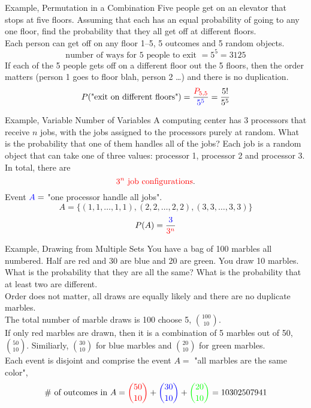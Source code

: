 \documentclass[]{beamer}
\newcommand{\blue}[1]{{\color{blue} #1}}
\newcommand{\red}[1]{{\color{red} #1}}
\newcommand{\grn}[1]{{\color{green} #1}}
\newcommand{\nl}[1]{\vspace{#1 em}}
\begin{document}
\begin{frame}{Example, Permutation in a Combination}
    Five people get on an elevator that stops at five floors. Assuming that each has an equal probability of going to any one floor, find the probability that they all get off at different floors.\\
    \nl{0.5}
    \pause Each person can get off on any floor 1--5, \blue{5 outcomes and 5 random objects}.
    \[\text{number of ways for 5 people to exit } = 5^5 = 3125\]
    \pause If each of the \red{5 people} gets off on a different floor out the \red{5 floors}, then the order matters (person 1 goes to floor blah, person 2 \ldots) and there is no duplication.
    \pause \[P(\text{"exit on different floors"}) = \frac{\red{P_{5,5}}}{\blue{5^5}} = \frac{5!}{5^5}\]
\end{frame}

\begin{frame}{Example, Variable Number of Variables}
    A computing center has 3 processors that receive $n$ jobs, with the jobs assigned to the processors purely at random. What is the probability that one of them handles all of the jobs?
    \pause
    Each job is a random object that can take one of three values: processor 1, processor 2 and processor 3. \pause In total, there are 
    \[\red{3^n \text{ job configurations}}.\]
    \pause Event $\blue{A} = $ "one processor handle all jobs".
    \pause \[A =\{ (1,1, \ldots,1,1), (2,2, \ldots,2,2), (3,3, \ldots,3,3) \}\]
    \pause \[P(A) =  \frac{\blue{3}}{\red{3^n}}\]
\end{frame}

\begin{frame}{Example, Drawing from Multiple Sets}
    You have a bag of 100 marbles all numbered. Half are red and 30 are blue and 20 are green. You draw 10 marbles. What is the probability that they are all the same? What is the probability that at least two are different.\\
    \nl{0.5}
    \pause Order does not matter, all draws are equally likely and there are no duplicate marbles.\\
    \nl{0.5}
    \pause The total number of marble draws is 100 choose 5, $\binom{100}{10}$.\\
    \nl{0.5}
    \pause If only red marbles are drawn, then it is a \red{combination of 5 marbles out of 50, $\binom{50}{10}$}. \pause Similiarly, \blue{$\binom{30}{10}$} for blue marbles and \grn{$\binom{20}{10}$} for green marbles.\\
    \nl{0.5}
    \pause Each event is disjoint and comprise the event $A=$ "all marbles are the same color",
    \pause \[\text{\# of outcomes in }A = \red{\binom{50}{10}} + \blue{\binom{30}{10}} + \grn{\binom{20}{10}} = 10302507941\]
\end{frame}
\end{document}

